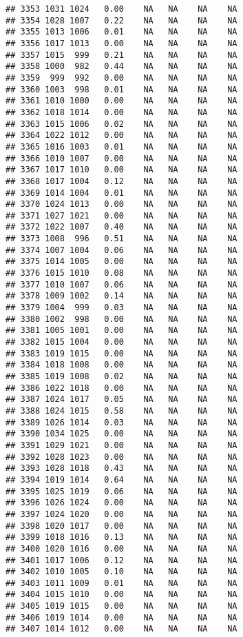 \documentclass{article}\usepackage{graphicx, color}
\makeatletter
\newenvironment{kframe}{%
 \def\at@end@of@kframe{}%
 \ifinner\ifhmode%
  \def\at@end@of@kframe{\end{minipage}}%
  \begin{minipage}{\columnwidth}%
 \fi\fi%
 \def\FrameCommand##1{\hskip\@totalleftmargin \hskip-\fboxsep
 \colorbox{shadecolor}{##1}\hskip-\fboxsep
     \hskip-\linewidth \hskip-\@totalleftmargin \hskip\columnwidth}%
 \MakeFramed {\advance\hsize-\width
   \@totalleftmargin\z@ \linewidth\hsize
   \@setminipage}}%
 {\par\unskip\endMakeFramed%
 \at@end@of@kframe}
\newenvironment{knitrout}{}{} %
\makeatother
\begin{document}
\begin{knitrout}
\begin{kframe}
\begin{verbatim}
## 3353 1031 1024   0.00    NA   NA    NA    NA
## 3354 1028 1007   0.22    NA   NA    NA    NA
## 3355 1013 1006   0.01    NA   NA    NA    NA
## 3356 1017 1013   0.00    NA   NA    NA    NA
## 3357 1015  999   0.21    NA   NA    NA    NA
## 3358 1000  982   0.44    NA   NA    NA    NA
## 3359  999  992   0.00    NA   NA    NA    NA
## 3360 1003  998   0.01    NA   NA    NA    NA
## 3361 1010 1000   0.00    NA   NA    NA    NA
## 3362 1018 1014   0.00    NA   NA    NA    NA
## 3363 1015 1006   0.02    NA   NA    NA    NA
## 3364 1022 1012   0.00    NA   NA    NA    NA
## 3365 1016 1003   0.01    NA   NA    NA    NA
## 3366 1010 1007   0.00    NA   NA    NA    NA
## 3367 1017 1010   0.00    NA   NA    NA    NA
## 3368 1017 1004   0.12    NA   NA    NA    NA
## 3369 1014 1004   0.01    NA   NA    NA    NA
## 3370 1024 1013   0.00    NA   NA    NA    NA
## 3371 1027 1021   0.00    NA   NA    NA    NA
## 3372 1022 1007   0.40    NA   NA    NA    NA
## 3373 1008  996   0.51    NA   NA    NA    NA
## 3374 1007 1004   0.06    NA   NA    NA    NA
## 3375 1014 1005   0.00    NA   NA    NA    NA
## 3376 1015 1010   0.08    NA   NA    NA    NA
## 3377 1010 1007   0.06    NA   NA    NA    NA
## 3378 1009 1002   0.14    NA   NA    NA    NA
## 3379 1004  999   0.03    NA   NA    NA    NA
## 3380 1002  998   0.00    NA   NA    NA    NA
## 3381 1005 1001   0.00    NA   NA    NA    NA
## 3382 1015 1004   0.00    NA   NA    NA    NA
## 3383 1019 1015   0.00    NA   NA    NA    NA
## 3384 1018 1008   0.00    NA   NA    NA    NA
## 3385 1019 1008   0.02    NA   NA    NA    NA
## 3386 1022 1018   0.00    NA   NA    NA    NA
## 3387 1024 1017   0.05    NA   NA    NA    NA
## 3388 1024 1015   0.58    NA   NA    NA    NA
## 3389 1026 1014   0.03    NA   NA    NA    NA
## 3390 1034 1025   0.00    NA   NA    NA    NA
## 3391 1029 1021   0.00    NA   NA    NA    NA
## 3392 1028 1023   0.00    NA   NA    NA    NA
## 3393 1028 1018   0.43    NA   NA    NA    NA
## 3394 1019 1014   0.64    NA   NA    NA    NA
## 3395 1025 1019   0.06    NA   NA    NA    NA
## 3396 1026 1024   0.00    NA   NA    NA    NA
## 3397 1024 1020   0.00    NA   NA    NA    NA
## 3398 1020 1017   0.00    NA   NA    NA    NA
## 3399 1018 1016   0.13    NA   NA    NA    NA
## 3400 1020 1016   0.00    NA   NA    NA    NA
## 3401 1017 1006   0.12    NA   NA    NA    NA
## 3402 1010 1005   0.10    NA   NA    NA    NA
## 3403 1011 1009   0.01    NA   NA    NA    NA
## 3404 1015 1010   0.00    NA   NA    NA    NA
## 3405 1019 1015   0.00    NA   NA    NA    NA
## 3406 1019 1014   0.00    NA   NA    NA    NA
## 3407 1014 1012   0.00    NA   NA    NA    NA

\end{verbatim}
\end{kframe}
\end{knitrout}
\end{document}
